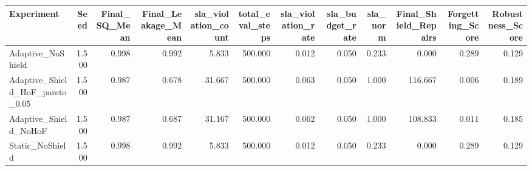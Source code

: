 \begin{tabular}{lrrrrrrrrrrr}
\toprule
Experiment & Seed & Final_SQ_Mean & Final_Leakage_Mean & sla_violation_count & total_eval_steps & sla_violation_rate & sla_budget_rate & sla_norm & Final_Shield_Repairs & Forgetting_Score & Robustness_Score \\
\midrule
Adaptive_NoShield & 1.500 & 0.998 & 0.992 & 5.833 & 500.000 & 0.012 & 0.050 & 0.233 & 0.000 & 0.289 & 0.129 \\
Adaptive_Shield_HoF_pareto_0.05 & 1.500 & 0.987 & 0.678 & 31.667 & 500.000 & 0.063 & 0.050 & 1.000 & 116.667 & 0.006 & 0.189 \\
Adaptive_Shield_NoHoF & 1.500 & 0.987 & 0.687 & 31.167 & 500.000 & 0.062 & 0.050 & 1.000 & 108.833 & 0.011 & 0.185 \\
Static_NoShield & 1.500 & 0.998 & 0.992 & 5.833 & 500.000 & 0.012 & 0.050 & 0.233 & 0.000 & 0.289 & 0.129 \\
\bottomrule
\end{tabular}
